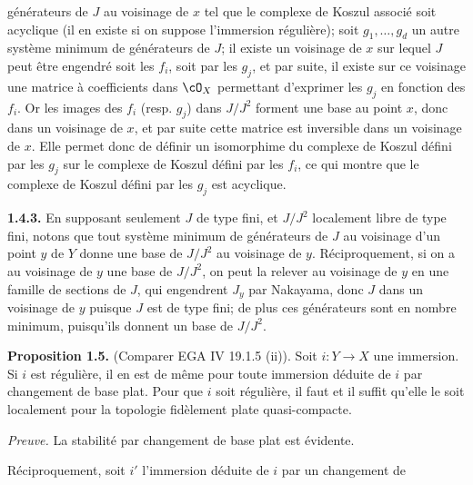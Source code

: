 générateurs de $J$ au voisinage de $x$ tel que le complexe de Koszul associé soit acyclique (il en existe si on suppose l'immersion régulière); soit $g_1,\ldots,g_d$ un autre système minimum de générateurs de $J$; il existe un voisinage de $x$ sur lequel $J$ peut être engendré soit les $f_i$, soit par les $g_j$, et par suite, il existe sur ce voisinage une matrice à coefficients dans $\cO_X$ permettant d'exprimer les $g_j$ en fonction des $f_i$. Or les images des $f_i$ (resp. $g_j$) dans $J/J^2$ forment une base au point $x$, donc dans un voisinage de $x$, et par suite cette matrice est inversible dans un voisinage de $x$. Elle permet donc de définir un isomorphime du complexe de Koszul défini par les $g_j$ sur le complexe de Koszul défini par les $f_i$, ce qui montre que le complexe de Koszul défini par les $g_j$ est acyclique.

\textbf{1.4.3.} En supposant seulement $J$ de type fini, et $J/J^2$ localement libre de type fini, notons que tout système minimum de générateurs de $J$ au voisinage d'un point $y$ de $Y$ donne une base de $J/J^2$ au voisinage de $y$. Réciproquement, si on a au voisinage de $y$ une base de $J/J^2$, on peut la relever au voisinage de $y$ en une famille de sections de $J$, qui engendrent $J_y$ par Nakayama, donc $J$ dans un voisinage de $y$ puisque $J$ est de type fini; de plus ces générateurs sont en nombre minimum, puisqu'ils donnent un base de $J/J^2$.

\textbf{Proposition 1.5.} (Comparer EGA IV 19.1.5 (ii)). Soit $i:Y\longrightarrow X$ une immersion. Si $i$ est régulière, il en est de même pour toute immersion déduite de $i$ par changement de base plat. Pour que $i$ soit régulière, il faut et il suffit qu'elle le soit localement pour la topologie fidèlement plate quasi-compacte.

\emph{Preuve.} La stabilité par changement de base plat est évidente.

Réciproquement, soit $i'$ l'immersion déduite de $i$ par un changement de
